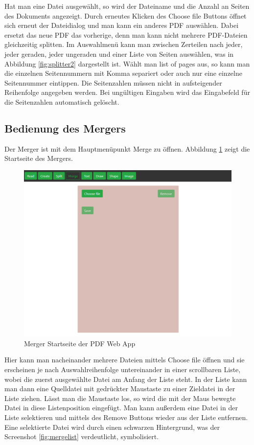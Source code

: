 Hat man eine Datei ausgewählt, so wird der Dateiname und die Anzahl an Seiten des Dokuments angezeigt. Durch erneutes Klicken des Choose file Buttons öffnet sich erneut der Dateidialog und man kann ein anderes PDF auswählen. Dabei ersetzt das neue PDF das vorherige, denn man kann nicht mehrere PDF-Dateien gleichzeitig splitten. Im Auswahlmenü kann man zwischen Zerteilen nach jeder, jeder geraden, jeder ungeraden und einer Liste von Seiten auswählen, was in Abbildung \ref{fig:splitter2} dargestellt ist. Wählt man list of pages aus, so kann man die einzelnen Seitennummern mit Komma separiert oder auch nur eine einzelne Seitennummer eintippen. Die Seitenzahlen müssen nicht in aufsteigender Reihenfolge angegeben werden. Bei ungültigen Eingaben wird das Eingabefeld für die Seitenzahlen automatisch gelöscht. 

\subsection{Bedienung des Mergers}
Der Merger ist mit dem Hauptmenüpunkt Merge zu öffnen. Abbildung \ref{fig:merger} zeigt die Startseite des Mergers. 

\begin{figure}[!htbp]
	\centering
	\includegraphics[width=1\textwidth]{"images/merger.png"}
	\caption{Merger Startseite der PDF Web App}
	\label{fig:merger}
\end{figure}

Hier kann man nacheinander mehrere Dateien mittels Choose file öffnen und sie erscheinen je nach Auswahlreihenfolge untereinander in einer scrollbaren Liste, wobei die zuerst ausgewählte Datei am Anfang der Liste steht. In der Liste kann man dann eine Quelldatei mit gedrückter Maustaste zu einer Zieldatei in der Liste ziehen. Lässt man die Maustaste los, so wird die mit der Maus bewegte Datei in diese Listenposition eingefügt. Man kann außerdem eine Datei in der Liste selektieren und mittels des Remove Buttons wieder aus der Liste entfernen. Eine selektierte Datei wird durch einen schwarzen Hintergrund, was der Screenshot \ref{fig:mergelist} verdeutlicht, symbolisiert.

